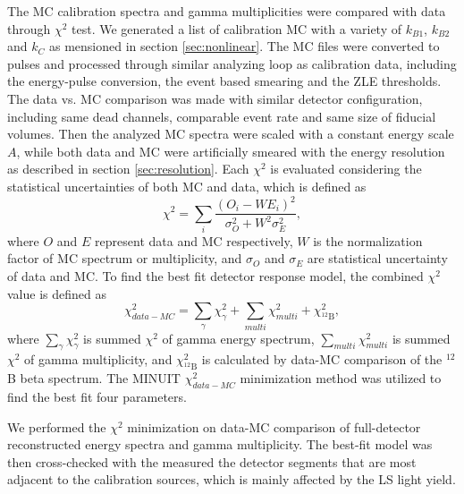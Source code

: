 \label{sec:dataMC}
The MC calibration spectra and gamma multiplicities were compared with data through $\chi^2$ test. 
We generated a list of calibration MC with a variety of $k_{B1}$, $k_{B2}$ and $k_C$ as mensioned in section \ref{sec:nonlinear}. 
The MC files were converted to pulses and processed through similar analyzing loop as calibration data, including the energy-pulse conversion, the event based smearing and the ZLE thresholds.
The data vs. MC comparison was made with similar detector configuration, including same dead channels, comparable event rate and same size of fiducial volumes.
Then the analyzed MC spectra were scaled with a constant energy scale $A$, while both data and MC were artificially smeared with the energy resolution as described in section \ref{sec:resolution}.
Each $\chi^2$ is evaluated considering the statistical uncertainties of both MC and data, which is defined as 
\begin{equation}
	\chi^2 = \sum_i\frac{(O_i - WE_i)^2}{\sigma_O^2 + W^2\sigma_E^2},
\end{equation}
where $O$ and $E$ represent data and MC respectively, $W$ is the normalization factor of MC spectrum or multiplicity, and $\sigma_O$ and $\sigma_E$ are statistical uncertainty of data and MC.
To find the best fit detector response model, the combined $\chi^2$ value is defined as
\begin{equation}\label{eq:escalechi2}
    \chi^2_{data-MC} = \sum_{\gamma} \chi^2_\gamma + \sum_{multi}\chi^2_{multi} + \chi^2_{^{12}\textrm{B}},
\end{equation}
where $\sum_{\gamma} \chi^2_\gamma$ is summed $\chi^2$ of gamma energy spectrum, $\sum_{multi} \chi^2_{multi}$ is summed $\chi^2$ of gamma multiplicity, and $\chi^2_{^{12}\textrm{B}}$ is calculated by data-MC comparison of the $^{12}$B beta spectrum.
The MINUIT $\chi^2_{data-MC}$ minimization method was utilized to find the best fit four parameters. 

We performed the $\chi^2$ minimization on data-MC comparison of full-detector reconstructed energy spectra and gamma multiplicity.
The best-fit model was then cross-checked with the measured the detector segments that are most adjacent to the calibration sources, which is mainly affected by the LS light yield.

